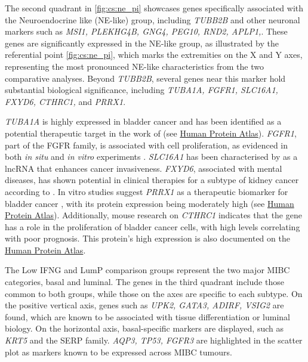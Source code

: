 The second quadrant in \cref{fig:cs:ne_pi} showcases genes specifically associated with the Neuroendocrine like (NE-like) group, including \textit{TUBB2B} and other neuronal markers such as \textit{MSI1, PLEKHG4B, GNG4, PEG10, RND2, APLP1,}\citep{Robertson2017-mg}. These genes are significantly expressed in the NE-like group, as illustrated by the referential point \cref{fig:cs:ne_pi}, which marks the extremities on the X and Y axes, representing the most pronounced NE-like characteristics from the two comparative analyses. Beyond \textit{TUBB2B}, several genes near this marker hold substantial biological significance, including \textit{TUBA1A, FGFR1, SLC16A1, FXYD6, CTHRC1,} and \textit{PRRX1}.

\textit{TUBA1A} is highly expressed in bladder cancer and has been identified as a potential therapeutic target in the work of \citet{Zhang2019-fk} (see \href{https://www.proteinatlas.org/ENSG00000167552-TUBA1A/tissue}{Human Protein Atlas}). \textit{FGFR1}, part of the FGFR family, is associated with cell proliferation, as evidenced in both \textit{in situ} and \textit{in vitro} experiments \citep{Tomlinson2009-td}. \textit{SLC16A1} has been characterised by \citet{Logotheti2020-ya} as a \acrlong{lncRNA} that enhances cancer invasiveness. \textit{FXYD6}, associated with mental diseases, has shown potential in clinical therapies for a subtype of kidney cancer according to \citet{Gao2014-sq}. In vitro studies suggest \textit{PRRX1} as a therapeutic biomarker for bladder cancer \citep{Huang2022-ez}, with its protein expression being moderately high (see \href{https://www.proteinatlas.org/ENSG00000116132-PRRX1/tissue}{Human Protein Atlas}). Additionally, mouse research on \textit{CTHRC1} indicates that the gene has a role in the proliferation of bladder cancer cells, with high levels correlating with poor prognosis. This protein's high expression is also documented on the \href{https://www.proteinatlas.org/ENSG00000164932-CTHRC1/tissue}{Human Protein Atlas}.

The Low IFNG and LumP comparison groups represent the two major MIBC categories, basal and luminal. The genes in the third quadrant include those common to both groups, while those on the axes are specific to each subtype. On the positive vertical axis, genes such as \textit{UPK2, GATA3, ADIRF, VSIG2} are found, which are known to be associated with tissue differentiation or luminal biology. On the horizontal axis, basal-specific markers are displayed, such as \textit{KRT5} and the SERP family. \textit{AQP3, TP53, FGFR3} are highlighted in the scatter plot as markers known to be expressed across MIBC tumours.

